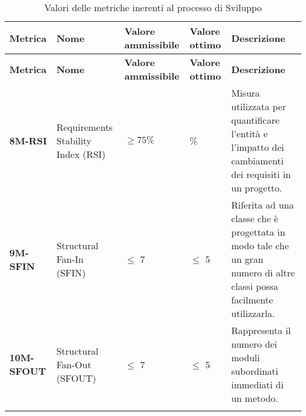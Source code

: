 \begin{longtable}{|>{\centering\arraybackslash}p{}|>{\centering\arraybackslash}p{}|>{\centering\arraybackslash}p{}|>{\centering\arraybackslash}p{}|>{\centering\arraybackslash}p{}|}
    \hline
    \textbf{Metrica} & \textbf{Nome} & \textbf{Valore ammissibile} & \textbf{Valore ottimo}& \textbf{Descrizione}\\
	\hline
    \endfirsthead
    \hline
    \textbf{Metrica} & \textbf{Nome} & \textbf{Valore ammissibile} & \textbf{Valore ottimo}& \textbf{Descrizione}\\
    \endhead
	\textbf{8M-RSI} 		& Requirements Stability Index (RSI) 	& $\geq 75\% $ 			& 100\% & Misura utilizzata per quantificare l’entità e l’impatto dei cambiamenti dei requisiti in un progetto.\\
	\hline
	\textbf{9M-SFIN} 		& Structural Fan-In (SFIN) 				&  		$\leq$ 7				& $\le$ 5 & Riferita ad una classe che è progettata in modo tale che un gran numero di altre classi possa facilmente utilizzarla.\\ 
	\hline
	\textbf{10M-SFOUT} 		& Structural Fan-Out (SFOUT) 			&  				$\leq$ 7 		& $\le$ 5 & Rappresenta il numero dei moduli subordinati immediati di un metodo.\\ 
	\hline
	\caption{ Valori delle metriche inerenti al processo di Sviluppo}
	\label{table:2}
\end{longtable}
